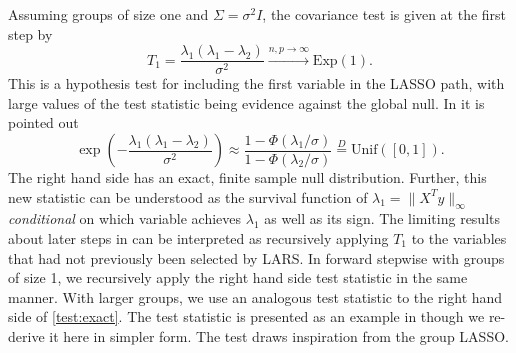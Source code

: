 \documentclass{imsart}
\begin{document}
Assuming groups of size one and $\Sigma = \sigma^2 I$, the covariance test is given at the first step by
\begin{equation}
\label{eq:covtest}
T_1 = \frac{\lambda_1(\lambda_1-\lambda_2)}{\sigma^2} \overset{n,p \to \infty}{\to} \text{Exp}(1).
\end{equation}
This is a hypothesis test for including the first variable in the LASSO
path, with large values of the test statistic being evidence against the
global null.
In \cite{tests:adaptive} it is pointed out 
\begin{equation}
\label{test:exact}
\exp\left(- \frac{\lambda_1(\lambda_1-\lambda_2)}{\sigma^2} \right) \approx \frac{1 - \Phi(\lambda_1/\sigma)}{1 - \Phi(\lambda_2 / \sigma)} \overset{D}{=} \text{Unif}([0,1]).
\end{equation}
The right hand side has an exact, finite sample null distribution.
Further, this new statistic can be understood as the survival function of $\lambda_1 = \|X^Ty\|_{\infty}$
{\em conditional} on which variable achieves $\lambda_1$ as well as its sign.
The limiting results about later steps in \cite{significance:lasso} can
be interpreted as
recursively applying $T_1$ to the variables that had not previously been selected by LARS. In forward stepwise with groups of size 1, we recursively apply the right hand side test statistic in the same manner. With larger groups, we use an analogous test statistic to the right hand side of \eqref{test:exact}. The test statistic is presented as an example in \cite{tests:adaptive} though we re-derive it here in simpler form. The test draws inspiration
from the group LASSO.
\end{document}
